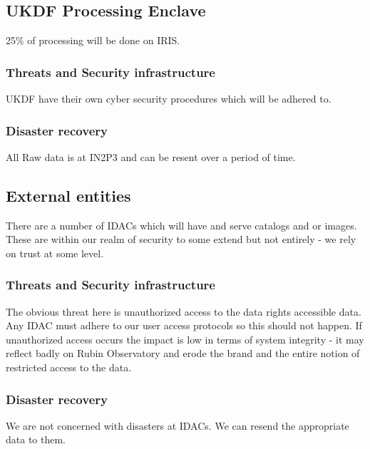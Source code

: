 \subsection{UKDF Processing  \gls{Enclave}}
25\% of processing will be done on \gls{IRIS}.
\subsubsection{Threats and Security infrastructure}
UKDF have their own cyber security procedures which will be adhered to.
\subsubsection{Disaster recovery}
All Raw data is at IN2P3 and can be resent over a period of time.


\subsection{External entities}
There are a number of \gls{IDAC}s which will have and serve catalogs and or images.
These are within our realm of security to some extend but not entirely - we rely on trust at some level.
\subsubsection{Threats and Security infrastructure}
The obvious threat here is unauthorized access to the data rights accessible data.
Any IDAC must adhere to our user access protocols so this should not happen.
If unauthorized access occurs the impact is low in terms of system integrity - it may reflect badly on Rubin Observatory and erode the brand and the entire notion of restricted access to the data.

\subsubsection{Disaster recovery}
We are not concerned with disasters at IDACs.
We can resend the appropriate data to them.
